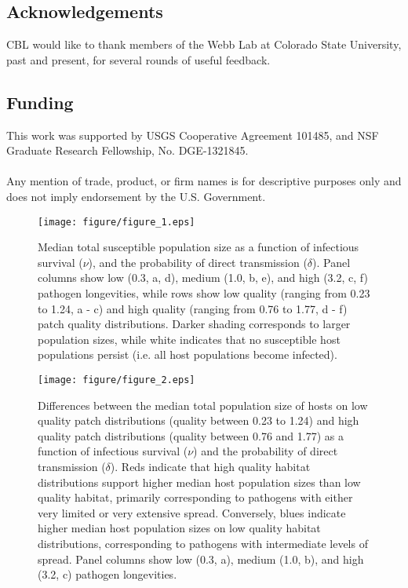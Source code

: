 \documentclass{article}
\begin{document}
\subsection*{Acknowledgements}

CBL would like to thank members of the Webb Lab at Colorado State University, past and present, for several rounds of useful feedback.  

\subsection*{Funding}

This work was supported by USGS Cooperative Agreement 101485, and NSF Graduate Research Fellowship, No. DGE-1321845.
\\
\\
Any mention of trade, product, or firm names is for descriptive purposes only and does not imply endorsement by the U.S. Government.

\clearpage

     

\clearpage

\begin{figure}
\texttt{[image: figure/figure\_1.eps]}
\caption{Median total susceptible population size as a function of infectious survival ($\nu$), and the probability of direct transmission ($\delta$).  Panel columns show low (0.3, a, d), medium (1.0, b, e), and high (3.2, c, f) pathogen longevities, while rows show low quality (ranging from 0.23 to 1.24, a - c) and high quality (ranging from 0.76 to 1.77, d - f) patch quality distributions.  Darker shading corresponds to larger population sizes, while white indicates that no susceptible host populations persist (i.e. all host populations become infected).}
\label{endemic}
\end{figure}

\begin{figure}
\texttt{[image: figure/figure\_2.eps]}
\centering
\caption{Differences between the median total population size of hosts on low quality patch distributions (quality between 0.23 to 1.24) and high quality patch distributions (quality between 0.76 and 1.77) as a function of infectious survival ($\nu$) and the probability of direct transmission ($\delta$).  Reds indicate that high quality habitat distributions support higher median host population sizes than low quality habitat, primarily corresponding to pathogens with either very limited or very extensive spread. Conversely, blues indicate higher median host population sizes on low quality habitat distributions, corresponding to pathogens with intermediate levels of spread.  Panel columns show low (0.3, a), medium (1.0, b), and high (3.2, c) pathogen longevities.}
\label{highvlow}
\end{figure}
\end{document}
